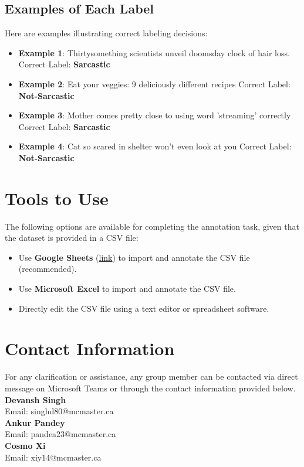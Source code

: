 \documentclass[12pt]{article}
\begin{document}
\subsection{Examples of Each Label}
Here are examples illustrating correct labeling decisions:

\begin{itemize}
    \item \textbf{Example 1}: Thirtysomething scientists unveil doomsday clock of hair loss. \newline
    Correct Label: \textbf{Sarcastic} 

    \item \textbf{Example 2}: Eat your veggies: 9 deliciously different recipes \newline
    Correct Label: \textbf{Not-Sarcastic} 

    \item \textbf{Example 3}: Mother comes pretty close to using word 'streaming' correctly \newline
    Correct Label: \textbf{Sarcastic} 

    \item \textbf{Example 4}: Cat so scared in shelter won't even look at you \newline
    Correct Label: \textbf{Not-Sarcastic} 

\end{itemize}

\section{Tools to Use}  
The following options are available for completing the annotation task, given that the dataset is provided in a CSV file:  

\begin{itemize}  
    \item Use \textbf{Google Sheets} (\href{https://workspace.google.com/intl/en_ca/products/sheets/}{link}) to import and annotate the CSV file (recommended).  
    \item Use \textbf{Microsoft Excel} to import and annotate the CSV file.  
    \item Directly edit the CSV file using a text editor or spreadsheet software.  

\end{itemize}  

\section{Contact Information}
For any clarification or assistance, any group member can be contacted via direct message on Microsoft Teams or 
through the contact information provided below.\\
\noindent
\textbf{Devansh Singh} \\
Email: singhd80@mcmaster.ca \\
\noindent
\textbf{Ankur Pandey} \\
Email: pandea23@mcmaster.ca \\
\noindent
\textbf{Cosmo Xi} \\
Email: xiy14@mcmaster.ca
\end{document}
